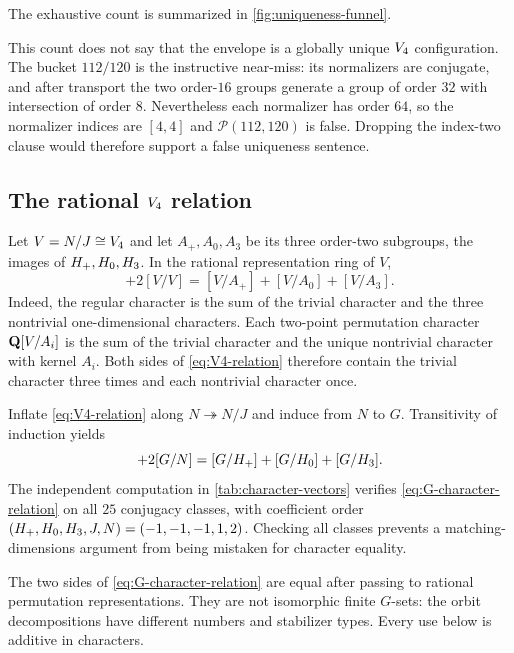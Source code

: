The exhaustive count is summarized in \cref{fig:uniqueness-funnel}.

This count does not say that the envelope is a globally unique $V_4$
configuration.  The bucket $112/120$ is the instructive near-miss: its
normalizers are conjugate, and after transport the two order-$16$ groups
generate a group of order $32$ with intersection of order $8$.  Nevertheless
each normalizer has order $64$, so the normalizer indices are $[4,4]$ and
$\mathcal P(112,120)$ is false.  Dropping the index-two clause would therefore
support a false uniqueness sentence.

\subsection{The rational \texorpdfstring{$V_4$}{V4} relation}

Let $V=N/J\cong V_4$ and let $A_+,A_0,A_3$ be its three order-two
subgroups, the images of $H_{+},H_{0},H_{3}$.  In the rational
representation ring of $V$,
\begin{equation}
 [V/1]+2[V/V]=[V/A_+]+[V/A_0]+[V/A_3].
 \label{eq:V4-relation}
\end{equation}
Indeed, the regular character is the sum of the trivial character and the
three nontrivial one-dimensional characters.  Each two-point permutation
character $\mathbf{Q}[V/A_i]$ is the sum of the trivial character and the unique
nontrivial character with kernel $A_i$.  Both sides of
\eqref{eq:V4-relation} therefore contain the trivial character three times
and each nontrivial character once.

Inflate \eqref{eq:V4-relation} along $N\twoheadrightarrow N/J$ and induce
from $N$ to $G$.  Transitivity of induction yields
\begin{equation}
 [G/J]+2[G/N]=[G/\Hplus]+[G/\Hzero]+[G/\Hthree].
 \label{eq:G-character-relation}
\end{equation}
The independent computation in \cref{tab:character-vectors} verifies
\eqref{eq:G-character-relation} on all $25$ conjugacy classes, with
coefficient order $(H_{+},H_{0},H_{3},J,N)=(-1,-1,-1,1,2)$.
Checking all classes prevents a matching-dimensions argument from being
mistaken for character equality.

\begin{remark}
The two sides of \eqref{eq:G-character-relation} are equal after passing to
rational permutation representations.  They are not isomorphic finite
$G$-sets: the orbit decompositions have different numbers and stabilizer
types.  Every use below is additive in characters.
\end{remark}

